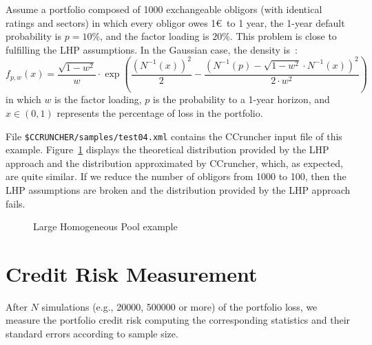 \documentclass[11pt,fleqn]{book} %
\begin{document}
\begin{example}
	\label{ex:test04}
	Assume a portfolio composed of \num{1000} exchangeable obligors (with 
	identical ratings and sectors) in which every obligor owes 1\euro\ to 
	1 year, the 1-year default probability is $p=10\%$, and the factor loading 
	is $20\%$. This problem is close to fulfilling the LHP assumptions. 
	In the Gaussian case, the density is~\cite[chap. 2.5]{bluhm:2002}: 
	\begin{displaymath}
		f_{p,w}(x) = 
		\frac{\sqrt{1-w^2}}{w} \cdot \exp\left( 
			\frac{\left(N^{-1}(x)\right)^2}{2} -
			\frac{\left(N^{-1}(p) - \sqrt{1-w^2} \cdot N^{-1}(x)\right)^2}{2 \cdot w^2}
		\right)
	\end{displaymath}
	in which $w$ is the factor loading, $p$ is the probability to a 1-year 
	horizon, and $x \in (0,1)$ represents the percentage of loss in the 
	portfolio. 

	File \texttt{\$CCRUNCHER/samples/test04.xml} contains the CCruncher input
	file of this example. Figure~\ref{fig:test04} displays the theoretical
	distribution provided by the LHP approach and the distribution approximated 
	by CCruncher, which, as expected, are quite similar. If we reduce the number 
	of obligors from \num{1000} to \num{100}, then the LHP assumptions are 
	broken and the distribution provided by the LHP approach fails.
\end{example}

\begin{figure}[!h]
	\centering
	\caption{Large Homogeneous Pool example}
	\label{fig:test04} 
\end{figure}

\section{Credit Risk Measurement}
\label{sec:riskm}

After $N$ simulations (e.g., \num{20000}, \num{500000} or more) of the 
portfolio loss, we measure the portfolio credit risk computing the 
corresponding statistics and their standard errors according to sample size. 
\end{document}

